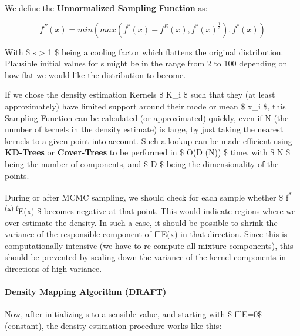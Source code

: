 We define the \textbf{Unnormalized Sampling Function} as:

\[
f^F(x) = min(max(f^*(x)-f^E(x), f^*(x)^\frac{1}{s}), f^*(x))
\]

With \$ s \textgreater{} 1 \$ being a cooling factor which flattens the
original distribution. Plausible initial values for s might be in the
range from 2 to 100 depending on how flat we would like the distribution
to become.

If we chose the density estimation Kernels \$ K\_i \$ such that they (at
least approximately) have limited support around their mode or mean \$
x\_i \$, this Sampling Function can be calculated (or approximated)
quickly, even if N (the number of kernels in the density estimate) is
large, by just taking the nearest kernels to a given point into account.
Such a lookup can be made efficient using \textbf{KD-Trees} or
\textbf{Cover-Trees} to be performed in \$ O(D \cdot \log(N)) \$ time,
with \$ N \$ being the number of components, and \$ D \$ being the
dimensionality of the points.

During or after MCMC sampling, we should check for each sample whether
\$ f\textsuperscript{*(x)-f}E(x) \$ becomes negative at that point. This
would indicate regions where we over-estimate the density. In such a
case, it should be possible to shrink the variance of the responsible
component of f\^{}E(x) in that direction. Since this is computationally
intensive (we have to re-compute all mixture components), this should be
prevented by scaling down the variance of the kernel components in
directions of high variance.

\paragraph{Density Mapping Algorithm (DRAFT)}

Now, after initializing s to a sensible value, and starting with \$
f\^{}E=0\$ (constant), the density estimation procedure works like this:

